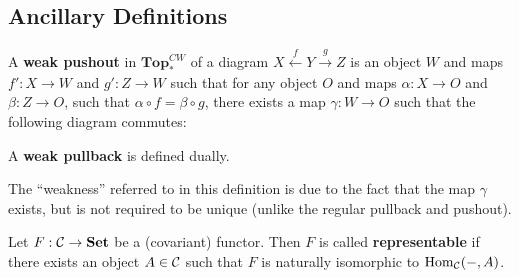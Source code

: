 \documentclass[12pt]{article}
\newcommand*{\pCW}{\mathbf{Top}^{CW}_\ast}
\begin{document}
\subsection{Ancillary Definitions}
\begin{defn}\label{def-weak-pushouts}
	A \textbf{weak pushout} in $\pCW$ of a diagram $X\xleftarrow{f}Y\xrightarrow{g}Z$ is an object $W$ and maps 
	$f':X\to W$ and $g':Z\to W$ such that for any object $O$ and maps $\alpha:X\to O$ and $\beta:Z\to O$, 
	such that $\alpha\circ f=\beta\circ g$, there exists a map $\gamma:W\to O$ such that the following diagram commutes:
	\begin{center}
	\end{center}

	A \textbf{weak pullback} is defined dually.
\end{defn}
\begin{rmk}
	The ``weakness'' referred to in this definition is due to the fact that the map $\gamma$ exists, but is not 
	required to be unique (unlike the regular pullback and pushout).
\end{rmk}

\begin{defn}\label{def-rep-func}
	Let $F:\mathcal{C}\to \mathbf{Set}$ be a (covariant) functor. Then $F$ is called \textbf{representable} if there exists an object $A\in \mathcal{C}$ such that
	$F$ is naturally isomorphic to $\operatorname{Hom}_{\mathcal{C}}(-,A)$.
\end{defn}
\end{document}
